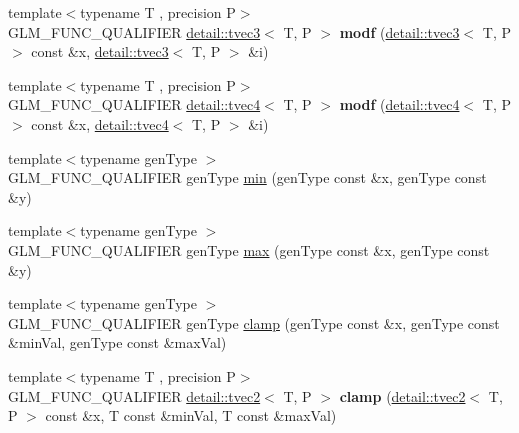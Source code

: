 \begin{DoxyCompactItemize}
\item 
{\footnotesize template$<$typename T , precision P$>$ }\\G\+L\+M\+\_\+\+F\+U\+N\+C\+\_\+\+Q\+U\+A\+L\+I\+F\+I\+ER \hyperlink{structglm_1_1detail_1_1tvec3}{detail\+::tvec3}$<$ T, P $>$ {\bfseries modf} (\hyperlink{structglm_1_1detail_1_1tvec3}{detail\+::tvec3}$<$ T, P $>$ const \&x, \hyperlink{structglm_1_1detail_1_1tvec3}{detail\+::tvec3}$<$ T, P $>$ \&i)\hypertarget{namespaceglm_a9ffab41035ab5fc8709bb582a3d8fae5}{}\label{namespaceglm_a9ffab41035ab5fc8709bb582a3d8fae5}

\item 
{\footnotesize template$<$typename T , precision P$>$ }\\G\+L\+M\+\_\+\+F\+U\+N\+C\+\_\+\+Q\+U\+A\+L\+I\+F\+I\+ER \hyperlink{structglm_1_1detail_1_1tvec4}{detail\+::tvec4}$<$ T, P $>$ {\bfseries modf} (\hyperlink{structglm_1_1detail_1_1tvec4}{detail\+::tvec4}$<$ T, P $>$ const \&x, \hyperlink{structglm_1_1detail_1_1tvec4}{detail\+::tvec4}$<$ T, P $>$ \&i)\hypertarget{namespaceglm_aeeecd3b255dc5fc394738bd25e0cea49}{}\label{namespaceglm_aeeecd3b255dc5fc394738bd25e0cea49}

\item 
{\footnotesize template$<$typename gen\+Type $>$ }\\G\+L\+M\+\_\+\+F\+U\+N\+C\+\_\+\+Q\+U\+A\+L\+I\+F\+I\+ER gen\+Type \hyperlink{group__core__func__common_ga3dc90dbd66c9ca1dd5625c93d9c50f02}{min} (gen\+Type const \&x, gen\+Type const \&y)
\item 
{\footnotesize template$<$typename gen\+Type $>$ }\\G\+L\+M\+\_\+\+F\+U\+N\+C\+\_\+\+Q\+U\+A\+L\+I\+F\+I\+ER gen\+Type \hyperlink{group__core__func__common_gaa228561a9da55898f8f72ad2403fafac}{max} (gen\+Type const \&x, gen\+Type const \&y)
\item 
{\footnotesize template$<$typename gen\+Type $>$ }\\G\+L\+M\+\_\+\+F\+U\+N\+C\+\_\+\+Q\+U\+A\+L\+I\+F\+I\+ER gen\+Type \hyperlink{group__core__func__common_ga72e9e213c84f06a329a2a838b51200f4}{clamp} (gen\+Type const \&x, gen\+Type const \&min\+Val, gen\+Type const \&max\+Val)
\item 
{\footnotesize template$<$typename T , precision P$>$ }\\G\+L\+M\+\_\+\+F\+U\+N\+C\+\_\+\+Q\+U\+A\+L\+I\+F\+I\+ER \hyperlink{structglm_1_1detail_1_1tvec2}{detail\+::tvec2}$<$ T, P $>$ {\bfseries clamp} (\hyperlink{structglm_1_1detail_1_1tvec2}{detail\+::tvec2}$<$ T, P $>$ const \&x, T const \&min\+Val, T const \&max\+Val)\hypertarget{namespaceglm_acfba9759719471fb9495f97046389339}{}\label{namespaceglm_acfba9759719471fb9495f97046389339}


\end{DoxyCompactItemize}
